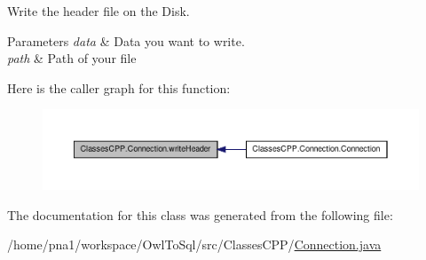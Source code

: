 Write the header file on the Disk. 


\begin{DoxyParams}{Parameters}
{\em data} & Data you want to write. \\
\hline
{\em path} & Path of your file \\
\hline
\end{DoxyParams}


Here is the caller graph for this function:\nopagebreak
\begin{figure}[H]
\begin{center}
\leavevmode
\includegraphics[width=400pt]{class_classes_c_p_p_1_1_connection_a09fb77eb74ce9dab17b70f1f2f0b778d_icgraph}
\end{center}
\end{figure}




The documentation for this class was generated from the following file:\begin{DoxyCompactItemize}
\item 
/home/pna1/workspace/OwlToSql/src/ClassesCPP/\hyperlink{_connection_8java}{Connection.java}\end{DoxyCompactItemize}
